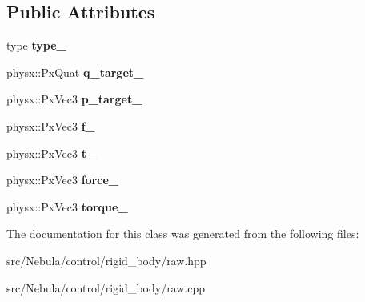 \subsection*{\-Public \-Attributes}
\begin{DoxyCompactItemize}
\item 
\hypertarget{classneb_1_1control_1_1rigid__body_1_1raw_a8f5fb347a6c58f62b223c48a1813e2e4}{type {\bfseries type\-\_\-}}\label{classneb_1_1control_1_1rigid__body_1_1raw_a8f5fb347a6c58f62b223c48a1813e2e4}

\item 
\hypertarget{classneb_1_1control_1_1rigid__body_1_1raw_ae6240e0e7bc73e47b332cf666cb376e2}{physx\-::\-Px\-Quat {\bfseries q\-\_\-target\-\_\-}}\label{classneb_1_1control_1_1rigid__body_1_1raw_ae6240e0e7bc73e47b332cf666cb376e2}

\item 
\hypertarget{classneb_1_1control_1_1rigid__body_1_1raw_a16d258b81e90c1a44ab68870a774a4f2}{physx\-::\-Px\-Vec3 {\bfseries p\-\_\-target\-\_\-}}\label{classneb_1_1control_1_1rigid__body_1_1raw_a16d258b81e90c1a44ab68870a774a4f2}

\item 
\hypertarget{classneb_1_1control_1_1rigid__body_1_1raw_aa3165ae427caee9d1ee8b37ac60fac6f}{physx\-::\-Px\-Vec3 {\bfseries f\-\_\-}}\label{classneb_1_1control_1_1rigid__body_1_1raw_aa3165ae427caee9d1ee8b37ac60fac6f}

\item 
\hypertarget{classneb_1_1control_1_1rigid__body_1_1raw_a47e186554eac3ec263be957cd97729d0}{physx\-::\-Px\-Vec3 {\bfseries t\-\_\-}}\label{classneb_1_1control_1_1rigid__body_1_1raw_a47e186554eac3ec263be957cd97729d0}

\item 
\hypertarget{classneb_1_1control_1_1rigid__body_1_1raw_af593c901f0a182fb0d83b6cdc097530e}{physx\-::\-Px\-Vec3 {\bfseries force\-\_\-}}\label{classneb_1_1control_1_1rigid__body_1_1raw_af593c901f0a182fb0d83b6cdc097530e}

\item 
\hypertarget{classneb_1_1control_1_1rigid__body_1_1raw_ad688c7f9453a2fca342c346087fda9f4}{physx\-::\-Px\-Vec3 {\bfseries torque\-\_\-}}\label{classneb_1_1control_1_1rigid__body_1_1raw_ad688c7f9453a2fca342c346087fda9f4}

\end{DoxyCompactItemize}


\-The documentation for this class was generated from the following files\-:\begin{DoxyCompactItemize}
\item 
src/\-Nebula/control/rigid\-\_\-body/raw.\-hpp\item 
src/\-Nebula/control/rigid\-\_\-body/raw.\-cpp\end{DoxyCompactItemize}
